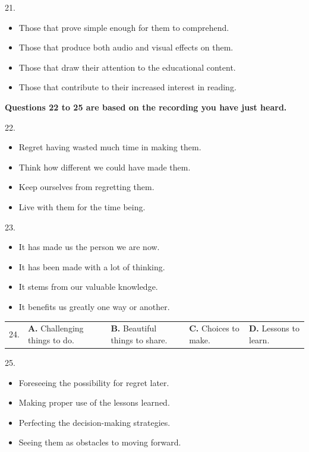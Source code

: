 \documentclass[UTF8,11pt]{ctexart}
\begin{document}
21.


\begin{itemize}[leftmargin=2em,itemsep=.2em,topsep=.4em]\item[A.] Those that prove simple enough for them to comprehend.
\item[B.] Those that produce both audio and visual effects on them.
\item[C.] Those that draw their attention to the educational content.
\item[D.] Those that contribute to their increased interest in reading.
\end{itemize}

\textbf{Questions 22 to 25 are based on the recording you have just heard.}


22.


\begin{itemize}[leftmargin=2em,itemsep=.2em,topsep=.4em]\item[A.] Regret having wasted much time in making them.
\item[B.] Think how different we could have made them.
\item[C.] Keep ourselves from regretting them.
\item[D.] Live with them for the time being.
\end{itemize}

23.


\begin{itemize}[leftmargin=2em,itemsep=.2em,topsep=.4em]\item[A.] It has made us the person we are now.
\item[B.] It has been made with a lot of thinking.
\item[C.] It stems from our valuable knowledge.
\item[D.] It benefits us greatly one way or another.
\end{itemize}

\noindent\begin{tabularx}{\linewidth}{@{}lXXXX@{}}24. & \textbf{A.} Challenging things to do. & \textbf{B.} Beautiful things to share. & \textbf{C.} Choices to make. & \textbf{D.} Lessons to learn.\\\end{tabularx}\par

25.


\begin{itemize}[leftmargin=2em,itemsep=.2em,topsep=.4em]\item[A.] Foreseeing the possibility for regret later.
\item[B.] Making proper use of the lessons learned.
\item[C.] Perfecting the decision-making strategies.
\item[D.] Seeing them as obstacles to moving forward.
\end{itemize}
\end{document}
